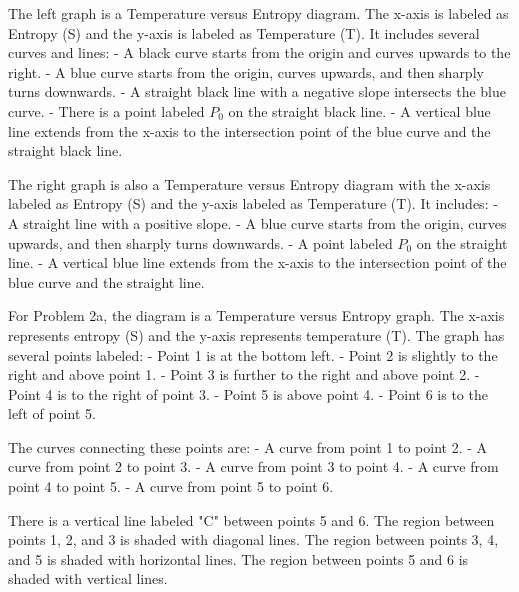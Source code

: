 The left graph is a Temperature versus Entropy diagram. The x-axis is labeled as Entropy (S) and the y-axis is labeled as Temperature (T). It includes several curves and lines:
- A black curve starts from the origin and curves upwards to the right.
- A blue curve starts from the origin, curves upwards, and then sharply turns downwards.
- A straight black line with a negative slope intersects the blue curve.
- There is a point labeled \(P_0\) on the straight black line.
- A vertical blue line extends from the x-axis to the intersection point of the blue curve and the straight black line.

The right graph is also a Temperature versus Entropy diagram with the x-axis labeled as Entropy (S) and the y-axis labeled as Temperature (T). It includes:
- A straight line with a positive slope.
- A blue curve starts from the origin, curves upwards, and then sharply turns downwards.
- A point labeled \(P_0\) on the straight line.
- A vertical blue line extends from the x-axis to the intersection point of the blue curve and the straight line.

For Problem 2a, the diagram is a Temperature versus Entropy graph. The x-axis represents entropy (S) and the y-axis represents temperature (T). The graph has several points labeled:
- Point 1 is at the bottom left.
- Point 2 is slightly to the right and above point 1.
- Point 3 is further to the right and above point 2.
- Point 4 is to the right of point 3.
- Point 5 is above point 4.
- Point 6 is to the left of point 5.

The curves connecting these points are:
- A curve from point 1 to point 2.
- A curve from point 2 to point 3.
- A curve from point 3 to point 4.
- A curve from point 4 to point 5.
- A curve from point 5 to point 6.

There is a vertical line labeled "C" between points 5 and 6. The region between points 1, 2, and 3 is shaded with diagonal lines. The region between points 3, 4, and 5 is shaded with horizontal lines. The region between points 5 and 6 is shaded with vertical lines.